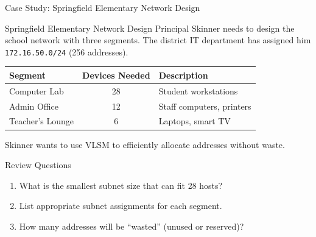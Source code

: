 \documentclass[aspectratio=169]{beamer}  %
\begin{document}
\begin{frame}{Case Study: Springfield Elementary Network Design}
    \begin{casestudy}{Springfield Elementary Network Design}
        Principal Skinner needs to design the school network with three segments. The district IT department has assigned him \texttt{172.16.50.0/24} (256 addresses).
        
        \vspace{0.5em}
        \begin{center}
            \scriptsize
            \begin{tabular}{l c l}
                \textbf{Segment} & \textbf{Devices Needed} & \textbf{Description} \\
                \midrule
                Computer Lab & 28 & Student workstations \\
                Admin Office & 12 & Staff computers, printers \\
                Teacher's Lounge & 6 & Laptops, smart TV \\
            \end{tabular}
        \end{center}
        
        Skinner wants to use VLSM to efficiently allocate addresses without waste.
    \end{casestudy}
    
    \begin{block}{Review Questions}
        \begin{enumerate}
            \small
            \item What is the smallest subnet size that can fit 28 hosts?
            \item List appropriate subnet assignments for each segment.
            \item How many addresses will be ``wasted'' (unused or reserved)?
        \end{enumerate}
    \end{block}
\end{frame}
\end{document}
